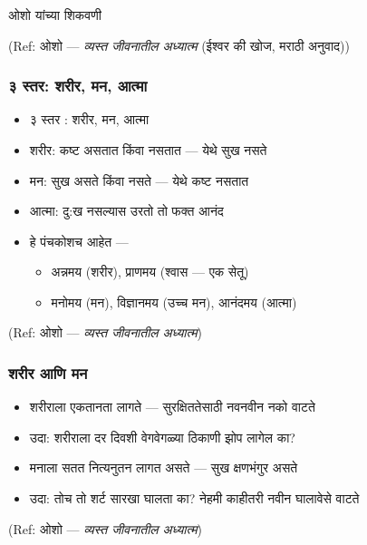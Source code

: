 \begin{frame}[fragile]\frametitle{}
\begin{center}
{\Large ओशो यांच्या शिकवणी}
\end{center}

{\tiny (Ref: ओशो --- \textit{व्यस्त जीवनातील अध्यात्म} (ईश्वर की खोज, मराठी अनुवाद))}

\end{frame}

\begin{frame}[fragile]\frametitle{३ स्तर: शरीर, मन, आत्मा}

	\begin{itemize}
	\item ३ स्तर : शरीर, मन, आत्मा
	\item शरीर: कष्ट असतात किंवा नसतात --- येथे सुख नसते
	\item मन: सुख असते किंवा नसते --- येथे कष्ट नसतात
	\item आत्मा: दु:ख नसल्यास उरतो तो फक्त आनंद
	\item हे पंचकोशच आहेत ---
		\begin{itemize}
		\item अन्नमय (शरीर), प्राणमय (श्वास --- एक सेतू)
		\item मनोमय (मन), विज्ञानमय (उच्च मन), आनंदमय (आत्मा)
		\end{itemize}
	\end{itemize}

{\tiny (Ref: ओशो --- \textit{व्यस्त जीवनातील अध्यात्म})}

\end{frame}

\begin{frame}[fragile]\frametitle{शरीर आणि मन}

	\begin{itemize}
	\item शरीराला एकतानता लागते --- सुरक्षिततेसाठी नवनवीन नको वाटते
	\item उदा: शरीराला दर दिवशी वेगवेगळ्या ठिकाणी झोप लागेल का?
	\item मनाला सतत नित्यनुतन लागत असते --- सुख क्षणभंगुर असते
	\item उदा: तोच तो शर्ट सारखा घालता का? नेहमी काहीतरी नवीन घालावेसे वाटते
	\end{itemize}

{\tiny (Ref: ओशो --- \textit{व्यस्त जीवनातील अध्यात्म})}

\end{frame}


